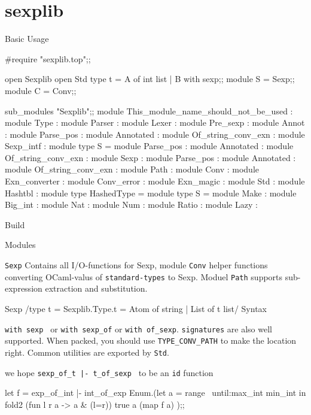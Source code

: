 \section{sexplib}
\label{sec:sexplib}
Basic Usage

\begin{bluetext}
#require "sexplib.top";;
\end{bluetext}
\begin{redcode}
open Sexplib
open Std
type t = A of int list | B with sexp;;
module S = Sexp;;
module C = Conv;;
\end{redcode}

\begin{redcode}
 sub_modules "Sexplib";;
module This_module_name_should_not_be_used :
    module Type :
    module Parser :
    module Lexer :
    module Pre_sexp :
        module Annot :
        module Parse_pos :
        module Annotated :
        module Of_string_conv_exn :
    module Sexp_intf :
        module type S =
            module Parse_pos :
            module Annotated :
            module Of_string_conv_exn :
    module Sexp :
        module Parse_pos :
        module Annotated :
        module Of_string_conv_exn :
    module Path :
    module Conv :
        module Exn_converter :
    module Conv_error :
    module Exn_magic :
    module Std :
        module Hashtbl :
            module type HashedType =
            module type S =
            module Make :
        module Big_int :
        module Nat :
        module Num :
        module Ratio :
        module Lazy :
\end{redcode}

Build

Modules

\verb|Sexp| Contains all I/O-functions for Sexp, module \verb|Conv|
helper functions converting OCaml-valus of \verb|standard-types| to
Sexp. Moduel \verb|Path| supports sub-expression extraction and
substitution.

Sexp 
/type t = Sexplib.Type.t = Atom of string | List of t list/
Syntax

\verb|with sexp | or \verb|with sexp_of| or \verb|with of_sexp|. 
\verb|signatures| are also  well supported. When packed, you should
use \verb|TYPE_CONV_PATH| to make the location right. Common utilities
are exported by \verb|Std|.

we hope \verb/sexp_of_t |- t_of_sexp / to be an \verb|id| function
\begin{redcode}
let f = exp_of_int |- int_of_exp 
Enum.(let a = range ~until:max_int min_int in 
        fold2 (fun l r a -> a & (l=r)) true a (map f a) );;  
\end{redcode}

